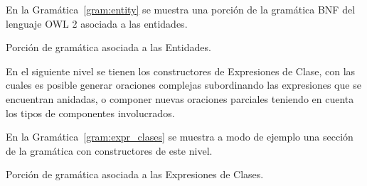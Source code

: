 En la Gramática~\ref{gram:entity} se muestra una porción de la gramática BNF del lenguaje OWL 2 asociada a las entidades.
\begin{GrammarEnv}
\begin{grammar}
[(colon){$\rightarrow$}]
[(semicolon)$|$]
[(comma){}]
[(period){\vspace{0.3cm} \\}]
[(quote){\begin{bf}}{\end{bf}}]
[(nonterminal){$<$}{$>$}]
\end{grammar}
\caption{Porción de gramática asociada a las Entidades.}\label{gram:entity}
\end{GrammarEnv}

En el siguiente nivel se tienen los constructores de Expresiones de Clase, con las cuales es posible generar oraciones complejas subordinando las expresiones que se encuentran anidadas, o componer nuevas oraciones parciales teniendo en cuenta los tipos de componentes involucrados.

En la Gramática~\ref{gram:expr_clases} se muestra a modo de ejemplo una sección de la gramática con constructores de este nivel.
\begin{GrammarEnv}
\begin{grammar}
[(colon){$\rightarrow$}]
[(semicolon)$|$]
[(comma){}]
[(period){\vspace{0.3cm} \\}]
[(quote){\begin{bf}}{\end{bf}}]
[(nonterminal){$<$}{$>$}]
\end{grammar}
\caption{Porción de gramática asociada a las Expresiones de Clases.}\label{gram:expr_clases}
\end{GrammarEnv}

